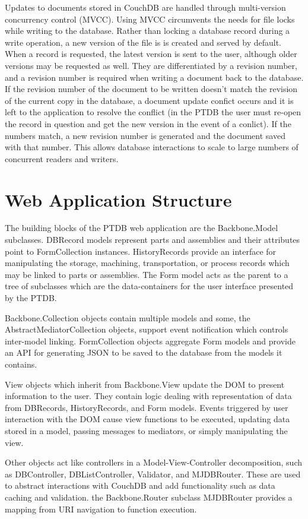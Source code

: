 \documentclass[journal]{IEEEtran}
\begin{document}
Updates to documents stored in CouchDB are handled through multi-version concurrency control (MVCC). Using MVCC
circumvents the needs for file locks while writing to the database. Rather than locking a database record during
a write operation, a new version of the file is is created and served by default. When a 
record is requested, the latest version is sent to the user, although older versions may be requested as well.
They are differentiated by a revision number, and a revision number is required when writing a document back 
to the database. If the revision number of the document to be written doesn't match the revision of the current
copy in the database,
a document update confict occurs and it is left to the application to resolve the conflict (in the PTDB the user must
re-open the record in question and get the new version in the event of a conlict). If the numbers match,
a new revision number is generated and the document saved with that number.
This allows database interactions to scale to large numbers of concurrent readers and writers.

\section{Web Application Structure}
The building blocks of the PTDB web application are the Backbone.Model subclasses. DBRecord models represent parts
and assemblies and their attributes point to FormCollection instances. HistoryRecords provide an interface for manipulating 
the storage, machining, transportation, or process records which may be linked to parts or assemblies. The Form model
acts as the parent to a tree of subclasses which are the data-containers for the user interface presented by the PTDB.

Backbone.Collection objects contain multiple models and some, the AbstractMediatorCollection objects, support event notification
which controls inter-model linking. FormCollection objects aggregate Form models and provide an API for generating JSON to be
saved to the database from the models it contains.

View objects which inherit from Backbone.View update the DOM to present information to the user. They contain logic dealing with
representation of data from DBRecords, HistoryRecords, and Form models. Events triggered by user interaction with the DOM cause 
view functions to be executed, updating data stored in a model, passing messages to mediators, or simply manipulating the view.

Other objects act like controllers in a Model-View-Controller decomposition, such as DBController, DBListController, Validator,
and MJDBRouter. These are used to abstract interactions with CouchDB and add functionality such as data caching and validation. 
the Backbone.Router subclass MJDBRouter provides a mapping from URI navigation to function execution.
\end{document}
